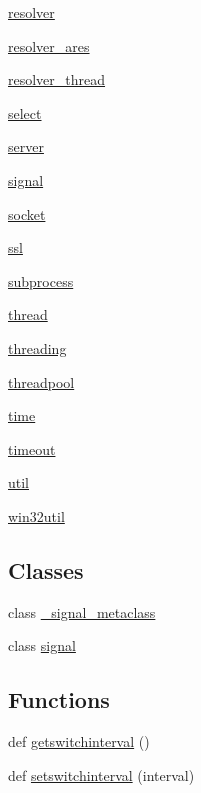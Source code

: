 \begin{DoxyCompactItemize}
 \hyperlink{namespacegevent_1_1resolver}{resolver}
\item 
 \hyperlink{namespacegevent_1_1resolver__ares}{resolver\+\_\+ares}
\item 
 \hyperlink{namespacegevent_1_1resolver__thread}{resolver\+\_\+thread}
\item 
 \hyperlink{namespacegevent_1_1select}{select}
\item 
 \hyperlink{namespacegevent_1_1server}{server}
\item 
 \hyperlink{namespacegevent_1_1signal}{signal}
\item 
 \hyperlink{namespacegevent_1_1socket}{socket}
\item 
 \hyperlink{namespacegevent_1_1ssl}{ssl}
\item 
 \hyperlink{namespacegevent_1_1subprocess}{subprocess}
\item 
 \hyperlink{namespacegevent_1_1thread}{thread}
\item 
 \hyperlink{namespacegevent_1_1threading}{threading}
\item 
 \hyperlink{namespacegevent_1_1threadpool}{threadpool}
\item 
 \hyperlink{namespacegevent_1_1time}{time}
\item 
 \hyperlink{namespacegevent_1_1timeout}{timeout}
\item 
 \hyperlink{namespacegevent_1_1util}{util}
\item 
 \hyperlink{namespacegevent_1_1win32util}{win32util}
\end{DoxyCompactItemize}
\subsection*{Classes}
\begin{DoxyCompactItemize}
\item 
class \hyperlink{classgevent_1_1__signal__metaclass}{\+\_\+signal\+\_\+metaclass}
\item 
class \hyperlink{classgevent_1_1signal}{signal}
\end{DoxyCompactItemize}
\subsection*{Functions}
\begin{DoxyCompactItemize}
\item 
def \hyperlink{namespacegevent_a13b200a3100c5b916ff019ebbf5ec8cf}{getswitchinterval} ()
\item 
def \hyperlink{namespacegevent_a2c1fff9114f66b1d8e209a0057ef6567}{setswitchinterval} (interval)
\end{DoxyCompactItemize}

